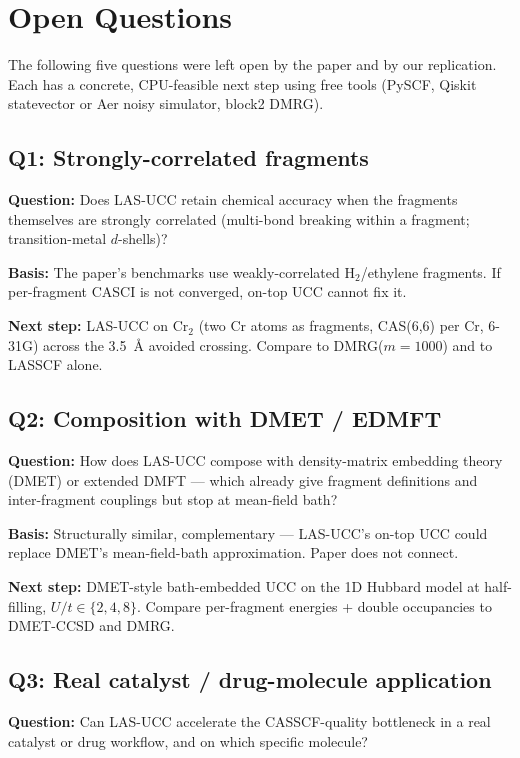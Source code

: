 \section{Open Questions}
\label{sec:open-questions}

The following five questions were left open by the paper and by our replication. Each has a concrete, CPU-feasible next step using free tools (PySCF, Qiskit statevector or Aer noisy simulator, block2 DMRG).

\subsection*{Q1: Strongly-correlated fragments}
\textbf{Question:} Does LAS-UCC retain chemical accuracy when the fragments themselves are strongly correlated (multi-bond breaking within a fragment; transition-metal $d$-shells)?

\textbf{Basis:} The paper's benchmarks use weakly-correlated H$_2$/ethylene fragments. If per-fragment CASCI is not converged, on-top UCC cannot fix it.

\textbf{Next step:} LAS-UCC on Cr$_2$ (two Cr atoms as fragments, CAS(6,6) per Cr, 6-31G) across the 3.5~\AA{} avoided crossing. Compare to DMRG($m{=}1000$) and to LASSCF alone.

\subsection*{Q2: Composition with DMET / EDMFT}
\textbf{Question:} How does LAS-UCC compose with density-matrix embedding theory (DMET) or extended DMFT --- which already give fragment definitions and inter-fragment couplings but stop at mean-field bath?

\textbf{Basis:} Structurally similar, complementary --- LAS-UCC's on-top UCC could replace DMET's mean-field-bath approximation. Paper does not connect.

\textbf{Next step:} DMET-style bath-embedded UCC on the 1D Hubbard model at half-filling, $U/t \in \{2,4,8\}$. Compare per-fragment energies + double occupancies to DMET-CCSD and DMRG.

\subsection*{Q3: Real catalyst / drug-molecule application}
\textbf{Question:} Can LAS-UCC accelerate the CASSCF-quality bottleneck in a real catalyst or drug workflow, and on which specific molecule?

